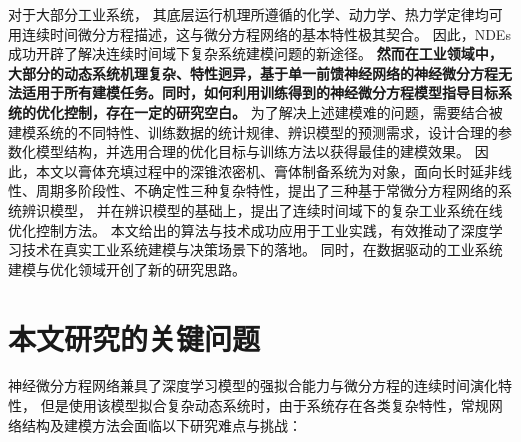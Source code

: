 

对于大部分工业系统，
其底层运行机理所遵循的化学、动力学、热力学定律均可用连续时间微分方程描述，这与微分方程网络的基本特性极其契合。
因此，NDEs成功开辟了解决连续时间域下复杂系统建模问题的新途径。
\textbf{然而在工业领域中，大部分的动态系统机理复杂、特性迥异，基于单一前馈神经网络的神经微分方程无法适用于所有建模任务。同时，如何利用训练得到的神经微分方程模型指导目标系统的优化控制，存在一定的研究空白。}
为了解决上述建模难的问题，需要结合被建模系统的不同特性、训练数据的统计规律、辨识模型的预测需求，设计合理的参数化模型结构，并选用合理的优化目标与训练方法以获得最佳的建模效果。
因此，本文以膏体充填过程中的深锥浓密机、膏体制备系统为对象，面向长时延非线性、周期多阶段性、不确定性三种复杂特性，提出了三种基于常微分方程网络的系统辨识模型，
并在辨识模型的基础上，提出了连续时间域下的复杂工业系统在线优化控制方法。
本文给出的算法与技术成功应用于工业实践，有效推动了深度学习技术在真实工业系统建模与决策场景下的落地。
同时，在数据驱动的工业系统建模与优化领域开创了新的研究思路。
\section{本文研究的关键问题}
\label{sec:challenge}

神经微分方程网络兼具了深度学习模型的强拟合能力与微分方程的连续时间演化特性，
但是使用该模型拟合复杂动态系统时，由于系统存在各类复杂特性，常规网络结构及建模方法会面临以下研究难点与挑战：
